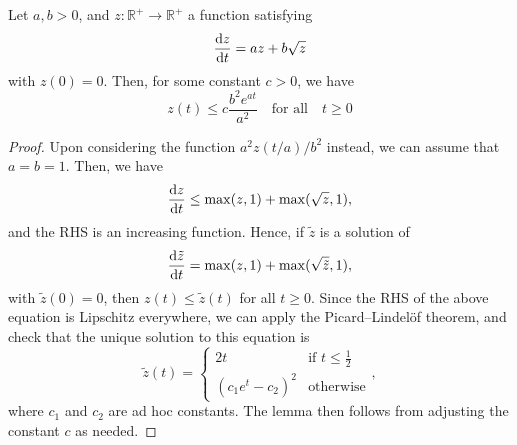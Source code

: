 \begin{lemma}\label{lem:norm_ode_solution}
    Let $a, b > 0$, and $z: \mathbb R^+ \to \mathbb R^+$ a function satisfying
    \[ \dv{z}{t}  = a z + b \sqrt{z} \]
    with $z(0) = 0$. Then, for some constant $c > 0$, we have
    \[ z(t) \leq c \frac{b^2 e^{at}}{a^2} \quad \text{for all} \quad t\geq 0\]
\end{lemma}
\begin{proof}
    Upon considering the function $a^2 z(t / a) / b^2$ instead, we can assume that $a = b = 1$. Then, we have
    \[ \dv{z}{t}   \leq \max(z, 1) + \max(\sqrt{z}, 1), \]
    and the RHS is an increasing function. Hence, if $\tilde z$ is a solution of
    \[ \dv{\tilde z}{t}  = \max(z, 1) + \max(\sqrt{\tilde z}, 1), \]
    with $\tilde z(0) = 0$, then $z(t) \leq \tilde z(t)$ for all $t \geq 0$. Since the RHS of the above equation is Lipschitz everywhere, we can apply the Picard–Lindelöf theorem, and check that the unique solution to this equation is
    \[ \tilde z(t) = \begin{cases}
        2 t & \text{if } t\leq \frac{1}{2}\\
        (c_1 e^{t} -c_2)^2 & \text{otherwise}
    \end{cases},\]
    where $c_1$ and $c_2$ are ad hoc constants. The lemma then follows from adjusting the constant $c$ as needed.
\end{proof}


